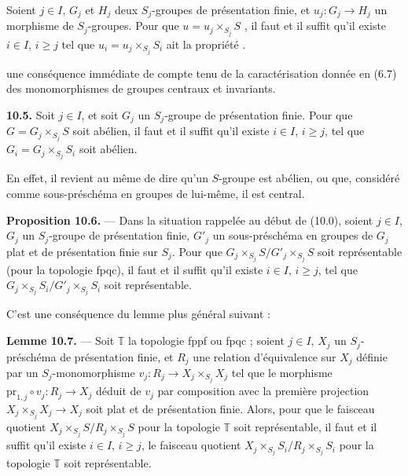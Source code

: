 \documentclass[11pt,a4paper]{article}
\begin{document}
 Soient $j \in I$, $G_{j}$ et $H_{j}$ deux $S_{j}$-groupes de
présentation finie, et $u_{j} \colon G_{j} \to H_{j}$ un morphisme de
$S_{j}$-groupes. Pour que $u = u_{j} \times_{S_{j}} S$ , il faut et il suffit qu'il existe $i \in I$,
$i \geqslant j$ tel que $u_{i} = u_{j} \times_{S_{j}} S_{i}$ ait la
 propriété .

   une conséquence
immédiate de   compte
tenu de la caractérisation donnée en (6.7) des monomorphismes de groupes
centraux et invariants.

 \textbf{10.5.} Soit $j \in I$, et soit $G_{j}$ un
$S_{j}$-groupe de présentation finie. Pour que
$G = G_{j} \times_{S_{j}} S$ soit abélien, il faut et il suffit qu'il
existe $i \in I$, $i \geqslant j$, tel que $G_{i} = G_{j} \times_{S_{j}}
S_{i}$ soit abélien.

En effet, il revient au même de dire qu'un $S$-groupe est abélien, ou que,
considéré comme sous-préschéma en groupes de lui-même, il est central.

\textbf{Proposition 10.6.} — Dans la situation rappelée au début de
(10.0), soient $j \in I$, $G_{j}$ un $S_{j}$-groupe de présentation finie,
$G'_{j}$ un sous-préschéma en groupes de $G_{j}$ plat et de présentation
finie sur $S_{j}$. Pour que
$G_{j} \times_{S_{j}} S / G'_{j} \times_{S_{j}} S$ soit représentable
(pour la topologie fpqc), il faut et il suffit qu'il existe $i \in I$,
$i \geqslant j$, tel que
$G_{j} \times_{S_{j}} S_{i} / G'_{j} \times_{S_{j}} S_{i}$ soit
représentable.

C'est une conséquence du lemme plus général suivant :

\textbf{Lemme 10.7.} — Soit $\mathbb{T}$ la topologie fppf ou fpqc ;
soient $j \in I$, $X_{j}$ un $S_{j}$-préschéma de
présentation finie, et $R_{j}$ une relation d'équivalence sur $X_{j}$
définie par un $S_{j}$-monomorphisme
$v_{j} \colon R_{j} \to X_{j} \times_{S_{j}} X_{j}$ tel que le morphisme
$\mathrm{pr}_{1,j} \circ v_{j} \colon R_{j} \to X_{j}$ déduit de $v_{j}$
par composition avec la première projection
$X_{j} \times_{S_{j}} X_{j} \to X_{j}$ soit plat et de présentation finie.
Alors, pour que le faisceau quotient
$X_{j} \times_{S_{j}} S / R_{j} \times_{S_{j}} S$ pour la topologie
$\mathbb{T}$ soit représentable, il faut et il suffit qu'il existe
$i \in I$, $i \geqslant j$, le faisceau quotient
$X_{j} \times_{S_{j}} S_{i} / R_{j} \times_{S_{j}} S_{i}$ pour la
topologie $\mathbb{T}$ soit représentable.
\end{document}
